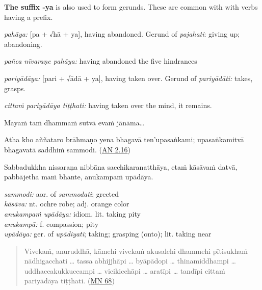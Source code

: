 \documentclass[11pt,oneside]{memoir}
\begin{document}
\normalArrayStrech

\textbf{The suffix -ya} is also used to form gerunds. These are common with with verbs having a prefix.

\emph{pahāya:} [pa + √hā + ya], having abandoned. Gerund of \emph{pajahati}: giving up; abandoning.

\emph{pañca nīvaraṇe pahāya:} having abandoned the five hindrances

\emph{pariyādāya:} [pari + √ādā + ya], having taken over. Gerund of \emph{pariyādāti:} takes, grasps.

\emph{cittaṁ pariyādāya tiṭṭhati:} having taken over the mind, it remains.

\bigskip

\begin{widecols}
Mayaṁ taṁ dhammaṁ sutvā evaṁ jānāma\ldots{}

Atha kho aññataro brāhmaṇo yena bhagavā ten'upasaṅkami; upasaṅkamitvā bhagavatā saddhiṁ sammodi. (\href{https://suttacentral.net/an2.11-20/pli/ms}{AN 2.16})

Sabbadukkha nissaraṇa nibbāna sacchikaranatthāya, etaṁ kāsāvaṁ datvā, pabbājetha maṁ bhante, anukampaṁ upādāya.

\columnbreak

\emph{sammodi:} aor. of \emph{sammodati}; greeted \\[0pt]
\emph{kāsāva:} nt. ochre robe; adj. orange color \\[0pt]
\emph{anukampaṁ upādāya:} idiom. lit. taking pity \\[0pt]
\emph{anukampā:} f. compassion; pity \\[0pt]
\emph{upādāya:} ger. of \emph{upādiyati}; taking; grasping (onto); lit. taking near
\end{widecols}

\clearpage

\begin{quote}
Vivekaṁ, anuruddhā, kāmehi vivekaṁ akusalehi dhammehi pītisukhaṁ nādhigacchati \ldots{} tassa abhijjhāpi
\ldots{} byāpādopi \ldots{} thinamiddhampi \ldots{} uddhaccakukkuccampi \ldots{} vicikicchāpi \ldots{}
aratīpi \ldots{} tandīpi cittaṁ pariyādāya tiṭṭhati. (\href{https://suttacentral.net/mn68/pli/ms}{MN 68})
\end{quote}
\end{document}
